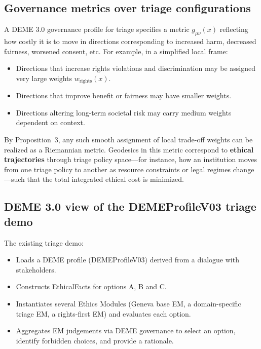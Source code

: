 \documentclass[12pt]{article}
\theoremstyle{remark}
\begin{document}
\subsection{Governance metrics over triage configurations}

A DEME 3.0 governance profile for triage specifies a metric $g_{\mu\nu}(x)$ reflecting how costly it is to move in directions corresponding to increased harm, decreased fairness, worsened consent, etc. For example, in a simplified local frame:

\begin{itemize}
    \item Directions that increase rights violations and discrimination may be assigned very large weights $w_{\mathrm{rights}}(x)$.
    \item Directions that improve benefit or fairness may have smaller weights.
    \item Directions altering long-term societal risk may carry medium weights dependent on context.
\end{itemize}

By Proposition~3, any such smooth assignment of local trade-off weights can be realized as a Riemannian metric. Geodesics in this metric correspond to \textbf{ethical trajectories} through triage policy space---for instance, how an institution moves from one triage policy to another as resource constraints or legal regimes change---such that the total integrated ethical cost is minimized.

\subsection{DEME 3.0 view of the DEMEProfileV03 triage demo}

The existing triage demo:

\begin{itemize}
    \item Loads a DEME profile (DEMEProfileV03) derived from a dialogue with stakeholders.
    \item Constructs EthicalFacts for options A, B and C.
    \item Instantiates several Ethics Modules (Geneva base EM, a domain-specific triage EM, a rights-first EM) and evaluates each option.
    \item Aggregates EM judgements via DEME governance to select an option, identify forbidden choices, and provide a rationale.
\end{itemize}
\end{document}
